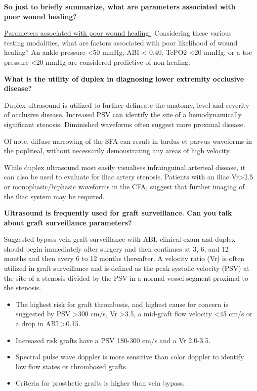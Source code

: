 \documentclass[
]{book}
\begin{document}
\textbf{So just to briefly summarize, what are parameters associated with poor
wound healing?}

\uline{Parameters associated with poor wound healing:}~Considering
these various testing modalities, what are factors associated with poor
likelihood of wound healing? An ankle pressure \textless50 mmHg, ABI \textless{} 0.40,
TcPO2 \textless20 mmHg, or a toe pressure \textless20 mmHg are considered predictive
of non-healing.

\textbf{What is the utility of duplex in diagnosing lower extremity occlusive
disease?}

Duplex ultrasound is utilized to further delineate the anatomy, level
and severity of occlusive disease. Increased PSV can identify the site
of a hemodynamically significant stenosis. Diminished waveforms often
suggest more proximal disease.

Of note, diffuse narrowing of the SFA can result in tardus et parvus
waveforms in the popliteal, without necessarily demonstrating any areas
of high velocity.\citep{aburahma2022, pellerito2019}

While duplex ultrasound most easily visualises infrainguinal arterieal
disease, it can also be used to evaluate for iliac artery stenosis.
Patients with an iliac Vr\textgreater2.5 or monophasic/biphasic waveforms in the
CFA, suggest that further imaging of the iliac system may be
required.\citep{heinen2018}

\textbf{Ultrasound is frequently used for graft surveillance. Can you talk
about graft surveillance parameters?}

Suggested bypass vein graft surveillance with ABI, clinical exam and
duplex should begin immediately after surgery and then continues at 3,
6, and 12 months and then every 6 to 12 months thereafter.\citep{conte2006, zierler2018} A velocity ratio (Vr) is often utilized in graft
surveillance and is defined as the peak systolic velocity (PSV) at the
site of a stenosis divided by the PSV in a normal vessel segment
proximal to the stenosis.

\begin{itemize}
\item
  The highest risk for graft thrombosis, and highest cause for concern
  is suggested by PSV \textgreater300 cm/s, Vr \textgreater3.5, a mid-graft flow velocity
  \textless45 cm/s or a drop in ABI \textgreater0.15.
  \citep{bandykHemodynamicsVeinGraft1988, zierler2018}
\item
  Increased risk grafts have a PSV 180-300 cm/s and a Vr 2.0-3.5.
\item
  Spectral pulse wave doppler is more sensitive than color doppler to
  identify low flow states or thrombosed grafts.\citep{hedrick2005}
\item
  Criteria for prosthetic grafts is higher than vein bypass.
  \citep{zierler2018}
\end{itemize}
\end{document}
